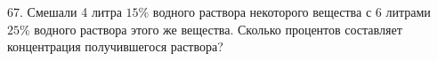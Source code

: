 67. Смешали 4 литра $15\%$ водного раствора некоторого вещества с 6 литрами $25\%$ водного раствора этого же вещества. Сколько процентов составляет концентрация получившегося раствора?\\
